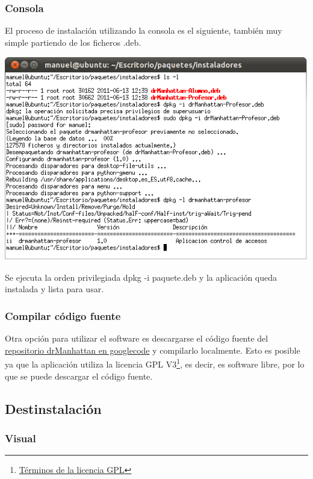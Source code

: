 \documentclass[11pt]{article}
\begin{document}
\subsubsection{Consola}

El proceso de instalación utilizando la consola es el siguiente, también muy simple partiendo de los ficheros .deb.


\begin{center}

    \includegraphics[width=.90\linewidth]{imagenes/instalacionConsola}

\end{center}

Se ejecuta la orden privilegiada dpkg -i paquete.deb y la aplicación queda instalada y lista para usar.

\subsubsection{Compilar código fuente}

Otra opción para utilizar el software es descargarse el código fuente del \href{http://code.google.com/p/drmanhattan/}{repositorio drManhattan en googlecode} y compilarlo localmente. Esto es posible ya que la aplicación utiliza la licencia GPL V3\footnote{\href{http://www.gnu.org/licenses/gpl.html}{Términos de la licencia GPL}}, es decir, es software libre, por lo que se puede descargar el código fuente.




\subsection{Destinstalación}

\subsubsection{Visual}
\end{document}

